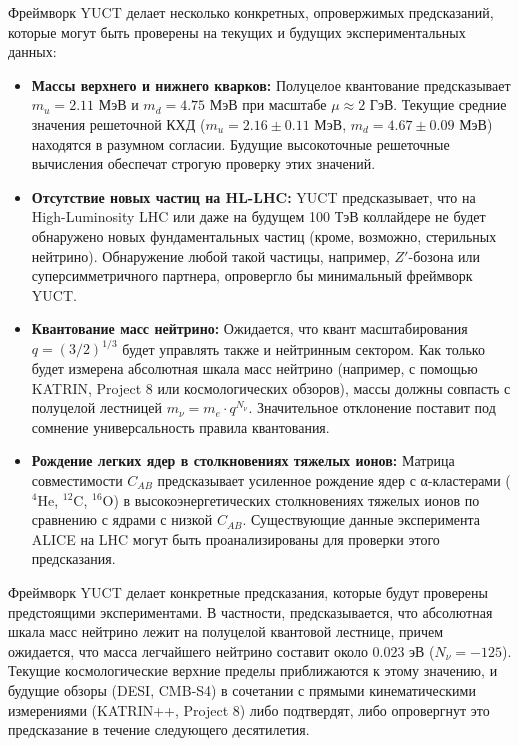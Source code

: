 \documentclass[11pt,a4paper]{article}
\begin{document}
	Фреймворк YUCT делает несколько конкретных, опровержимых предсказаний, которые могут быть проверены на текущих и будущих экспериментальных данных:
	
	\begin{itemize}
		\item \textbf{Массы верхнего и нижнего кварков:} Полуцелое квантование предсказывает $m_u = 2.11$ МэВ и $m_d = 4.75$ МэВ при масштабе $\mu \approx 2$ ГэВ. Текущие средние значения решеточной КХД \cite{PDG2024} ($m_u = 2.16 \pm 0.11$ МэВ, $m_d = 4.67 \pm 0.09$ МэВ) находятся в разумном согласии. Будущие высокоточные решеточные вычисления обеспечат строгую проверку этих значений.
		
		\item \textbf{Отсутствие новых частиц на HL-LHC:} YUCT предсказывает, что на High-Luminosity LHC или даже на будущем 100 ТэВ коллайдере не будет обнаружено новых фундаментальных частиц (кроме, возможно, стерильных нейтрино). Обнаружение любой такой частицы, например, \(Z'\)-бозона или суперсимметричного партнера, опровергло бы минимальный фреймворк YUCT.
		
		\item \textbf{Квантование масс нейтрино:} Ожидается, что квант масштабирования $q = (3/2)^{1/3}$ будет управлять также и нейтринным сектором. Как только будет измерена абсолютная шкала масс нейтрино (например, с помощью KATRIN, Project 8 или космологических обзоров), массы должны совпасть с полуцелой лестницей $m_\nu = m_e \cdot q^{N_\nu}$. Значительное отклонение поставит под сомнение универсальность правила квантования.
		
		\item \textbf{Рождение легких ядер в столкновениях тяжелых ионов:} Матрица совместимости $C_{AB}$ предсказывает усиленное рождение ядер с α-кластерами ($^4$He, $^{12}$C, $^{16}$O) в высокоэнергетических столкновениях тяжелых ионов по сравнению с ядрами с низкой $C_{AB}$. Существующие данные эксперимента ALICE на LHC могут быть проанализированы для проверки этого предсказания.
	\end{itemize}
	
	Фреймворк YUCT делает конкретные предсказания, которые будут проверены предстоящими экспериментами. В частности, предсказывается, что абсолютная шкала масс нейтрино лежит на полуцелой квантовой лестнице, причем ожидается, что масса легчайшего нейтрино составит около $0.023$ эВ ($N_\nu = -125$). Текущие космологические верхние пределы приближаются к этому значению, и будущие обзоры (DESI, CMB‑S4) в сочетании с прямыми кинематическими измерениями (KATRIN++, Project 8) либо подтвердят, либо опровергнут это предсказание в течение следующего десятилетия.
	
\end{document}
